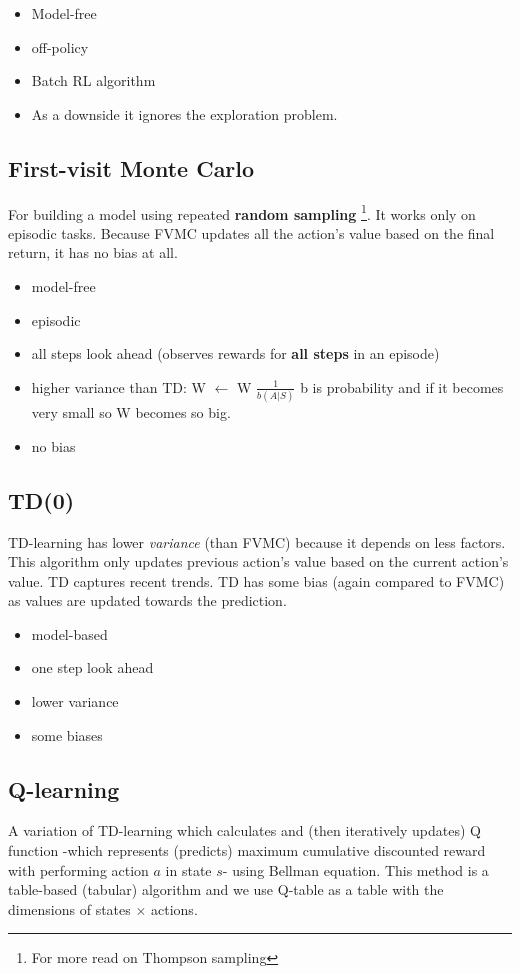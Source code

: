 \documentclass[a4paper,12pt]{article}
\begin{document}
\begin{itemize}
    \item Model-free \cite{Lagoudakis2003}
    \item off-policy
    \item Batch RL algorithm
    \item As a downside it ignores the exploration problem.
\end{itemize}

\subsection{First-visit Monte Carlo}
For building a model using repeated \textbf{random sampling} \footnote{For more read on Thompson sampling}. It works only on episodic tasks. Because FVMC updates all the action's value based on the final return, it has no bias at all.
\begin{itemize}
    \item model-free
    \item episodic
    \item  all steps look ahead (observes rewards for \textbf{all steps} in an episode)
    \item higher variance than TD: W $\leftarrow$ W $\frac{1}{b(A|S)}$ b is probability and if it becomes very small so W becomes so big.
    \item no bias
\end{itemize}

\subsection{TD(0)}
TD-learning has lower \textit{variance} (than FVMC) because it depends on less factors. This algorithm only updates previous action's value based on the current action's value. TD captures recent trends. TD has some bias (again compared to FVMC) as values are updated towards the prediction.
\begin{itemize}
    \item model-based
    \item one step look ahead
    \item lower variance
    \item some biases
\end{itemize}

\subsection{Q-learning}
A variation of TD-learning which calculates and (then iteratively updates) Q function -which represents (predicts) maximum cumulative discounted reward with performing action $a$ in state $s$- using Bellman equation. This method is a table-based (tabular) algorithm and we use Q-table as a table with the dimensions of states $\times$ actions.
\end{document}
